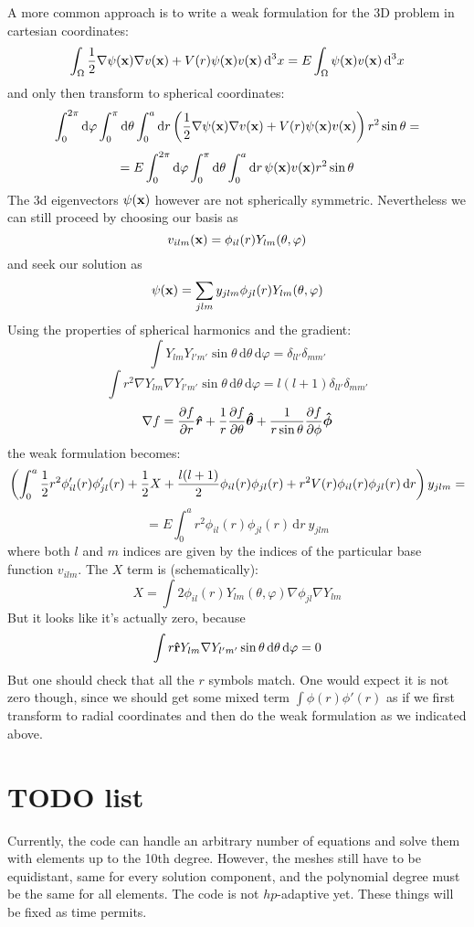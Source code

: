 \documentclass[12pt]{article}
\def\d{\mbox{d}}
\begin{document}
A more common approach is to write a weak formulation for
the 3D problem in cartesian coordinates:
$$
\int_\Omega{1\over2}\nabla\psi({\bf x})\nabla v({\bf x})+V(r)\psi({\bf x})v({\bf
x})\,\d^3 x
=E\int_\Omega\psi({\bf x})v({\bf x})\,\d^3 x
$$
and only then transform to spherical coordinates:
$$
\int_0^{2\pi}\d\varphi\int_0^\pi\d\theta\int_0^a\d r
\left({1\over2}\nabla\psi({\bf x})\nabla v({\bf x})+V(r)\psi({\bf
x})v({\bf x})\right)r^2\sin\theta=
$$
$$
=
E\int_0^{2\pi}\d\varphi\int_0^\pi\d\theta\int_0^a\d r\,
\psi({\bf x})v({\bf x})r^2\sin\theta
$$
The 3d eigenvectors $\psi({\bf x})$ however are not spherically symmetric.
Nevertheless we can still proceed by choosing our basis as
$$v_{ilm}({\bf x})=\phi_{il}(r)Y_{lm}(\theta, \varphi)$$
and seek our solution as
$$\psi({\bf x})=\sum_{jlm}y_{jlm}\phi_{jl}(r)Y_{lm}(\theta, \varphi)$$
Using the properties of spherical harmonics and the gradient:
$$\int Y_{lm} Y_{l'm'} \sin\theta\,\d\theta\,\d\varphi=
\delta_{ll'}\delta_{mm'}$$
$$\int r^2\nabla Y_{lm} \nabla Y_{l'm'} \sin\theta\,\d\theta\,\d\varphi=
l(l+1)\delta_{ll'}\delta_{mm'}$$
$$\nabla f = {\partial f\over \partial r}\boldsymbol{\hat r} + {1\over r}
{\partial f\over\partial\theta}\boldsymbol{\hat\theta}+{1\over r\sin\theta}
{\partial f\over\partial\phi}\boldsymbol{\hat\phi}$$
the weak formulation becomes:
$$
\left(\int_0^a
{1\over2}r^2\phi_{il}'(r)\phi_{jl}'(r)+
{1\over2}X+
{l(l+1)\over2}\phi_{il}(r)\phi_{jl}(r)+
r^2V(r)\phi_{il}(r)\phi_{jl}(r)\,\d r\right)y_{jlm}=
$$
$$ = E\int_0^ar^2 \phi_{il}(r)\phi_{jl}(r)\,\d r\ y_{jlm} $$
where both $l$ and $m$ indices are given by the indices of the particular base
function $v_{ilm}$. The $X$ term is (schematically):
$$X=\int 2 \phi_{il}(r)Y_{lm}(\theta,\varphi)\nabla\phi_{jl}\nabla Y_{lm}$$
But it looks like it's actually zero, because
$$\int r{\bf \hat r} Y_{lm} \nabla Y_{l'm'} \sin\theta\,\d\theta\,\d\varphi=
0$$
But one should check that all the $r$ symbols match. One would expect it is not
zero though, since we should get some mixed term $\int\phi(r) \phi'(r)$ as if we
first transform to radial coordinates and then do the weak formulation as we
indicated above.


\section{TODO list}

Currently, the code can handle an arbitrary number of equations and solve them
with elements up to the 10th degree. However, the meshes still have to be
equidistant, same for every solution component, and the polynomial degree must
be the same for all elements. The code is not $hp$-adaptive yet. These things
will be fixed as time permits.
\end{document}
